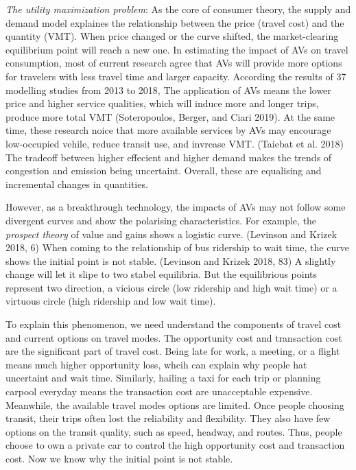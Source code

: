 \documentclass[12pt,]{article}
\begin{document}
\emph{The utility maximization problem}: As the core of consumer theory,
the supply and demand model explaines the relationship between the price
(travel cost) and the quantity (VMT). When price changed or the curve
shifted, the market-clearing equilibrium point will reach a new one. In
estimating the impact of AVs on travel consumption, most of current
research agree that AVs will provide more options for travelers with
less travel time and larger capacity. According the results of 37
modelling studies from 2013 to 2018, The application of AVs means the
lower price and higher service qualities, which will induce more and
longer trips, produce more total VMT (Soteropoulos, Berger, and Ciari
2019). At the same time, these research noice that more available
services by AVs may encourage low-occupied vehile, reduce transit use,
and invrease VMT. (Taiebat et al. 2018) The tradeoff between higher
effecient and higher demand makes the trends of congestion and emission
being uncertaint. Overall, these are equalising and incremental changes
in quantities.

However, as a breakthrough technology, the impacts of AVs may not follow
some divergent curves and show the polarising characteristics. For
example, the \emph{prospect theory} of value and gains shows a logistic
curve. (Levinson and Krizek 2018, 6) When coming to the relationship of
bus ridership to wait time, the curve shows the initial point is not
stable. (Levinson and Krizek 2018, 83) A slightly change will let it
slipe to two stabel equilibria. But the equilibrious points represent
two direction, a vicious circle (low ridership and high wait time) or a
virtuous circle (high ridership and low wait time).

To explain this phenomenon, we need understand the components of travel
cost and current options on travel modes. The opportunity cost and
transaction cost are the significant part of travel cost. Being late for
work, a meeting, or a flight means much higher opportunity loss, whcih
can explain why people hat uncertaint and wait time. Similarly, hailing
a taxi for each trip or planning carpool everyday means the transaction
cost are unacceptable expensive. Meanwhile, the available travel modes
options are limited. Once people choosing transit, their trips often
lost the reliability and flexibility. They also have few options on the
transit quality, such as speed, headway, and routes. Thus, people choose
to own a private car to control the high opportunity cost and
transaction cost. Now we know why the initial point is not stable.
\end{document}

